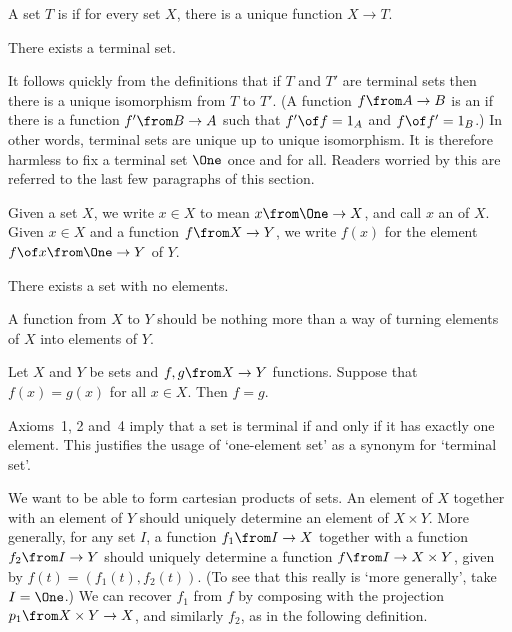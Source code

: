 \documentclass[12pt]{article}
\begin{document}
\begin{dfn}
A set $T$ is  if for every set $X$, there is a unique
function $X \to T$.
\end{dfn}

\begin{axiom}
There exists a terminal set.
\end{axiom}

It follows quickly from the definitions that if $T$ and $T'$ are terminal
sets then there is a unique isomorphism from $T$ to $T'$.  (A function $f
\from A \to B$ is an  if there is a function $f' \from B
\to A$ such that $f' \of f = 1_A$ and $f \of f' = 1_B$.)  In other words,
terminal sets are unique up to unique isomorphism.  It is therefore
harmless to fix a terminal set $\One$ once and for all.  Readers worried by
this are referred to the last few paragraphs of this section.

\begin{dfn}
Given a set $X$, we write $x \in X$ to mean $x\from \One \to X$, and call
$x$ an  of $X$.  Given $x \in X$ and a function $f\from X
\to Y$, we write $f(x)$ for the element $f \of x\from \One \to Y$ of
$Y$. 
\end{dfn}



\begin{axiom}
There exists a set with no elements.
\end{axiom}


% 
A function from $X$ to $Y$ should be nothing more than a way of turning
elements of $X$ into elements of $Y$.  

\begin{axiom}
Let $X$ and $Y$ be sets and $f, g\from X \to Y$ functions.  Suppose that
$f(x) = g(x)$ for all $x \in X$.  Then $f = g$.
\end{axiom}

Axioms~1, 2 and~4 imply that a set is terminal if and only if it has
exactly one element.  This justifies the usage of `one-element set' as a
synonym for `terminal set'.


% 
We want to be able to form cartesian products of sets.  An element of $X$
together with an element of $Y$ should uniquely determine an element of $X
\times Y$.  More generally, for any set $I$, a function $f_1 \from I \to X$
together with a function $f_2 \from I \to Y$ should uniquely determine a
function $f \from I \to X \times Y$, given by $f(t) = (f_1(t),
f_2(t))$.  (To see that this really is `more generally', take $I =
\One$.)  We can recover $f_1$ from $f$ by composing with the projection
$p_1 \from X \times Y \to X$, and similarly $f_2$, as in the following
definition. 
\end{document}
